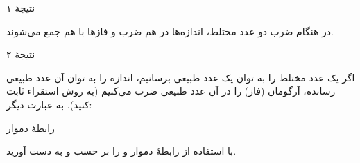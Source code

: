 

\begin{EMimportant}{}


\end{EMimportant}

\begin{EMremark}{نتیجهٔ ۱}

در هنگام ضرب دو عدد مختلط، اندازه‌ها در هم ضرب و فازها با هم جمع می‌شوند.

\end{EMremark}

\begin{EMremark}{نتیجهٔ ۲}

اگر یک عدد مختلط را به توان یک عدد طبیعی برسانیم، اندازه را به توان آن عدد طبیعی رسانده، آرگومان (فاز) را در آن عدد طبیعی ضرب می‌کنیم (به روش استقراء ثابت کنید). به عبارت دیگر:

\end{EMremark}


\begin{EMimportant}{رابطهٔ دموار}


\end{EMimportant}

\begin{EMexercise}{}

با استفاده از رابطهٔ دموار  و  را بر حسب \EMim{\cos\theta} و \EMim{\sin\theta} به دست آورید.

\end{EMexercise}

